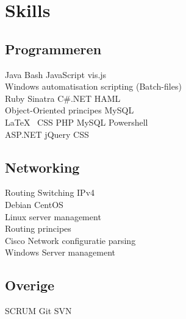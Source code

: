 \documentclass[a4paper]{deedy-resume} %
\begin{document}
\begin{minipage}[t]{0.33\textwidth} %


\section{Skills}

\subsection{Programmeren}

Java \textbullet{} Bash \textbullet{} JavaScript\textbullet{} vis.js \\ Windows automatisation scripting (Batch-files) \\ 
Ruby \textbullet{} Sinatra \textbullet{} C\#.NET  \textbullet{} HAML \\ Object-Oriented principes \textbullet{} MySQL \\

\vspace{\topsep} %
\LaTeX\ \textbullet{} CSS \textbullet{} PHP \textbullet{} MySQL \textbullet{} Powershell \\
ASP.NET \textbullet jQuery \textbullet CSS 

\sectionspace %

\subsection{Networking}

Routing \textbullet{} Switching \textbullet{} IPv4 \\ 
Debian \textbullet{} CentOS \\ Linux server management \\ Routing principes \\ Cisco \textbullet{} Network configuratie parsing \\ Windows Server management\\

\sectionspace %

\subsection{Overige}
SCRUM \textbullet{} Git \textbullet SVN \\


\end{minipage}
\end{document}
